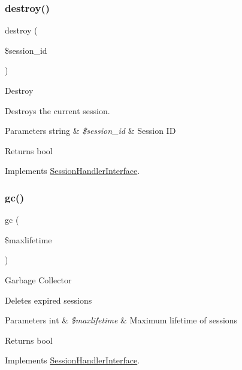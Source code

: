 \subsubsection{\texorpdfstring{destroy()}{destroy()}}
{\footnotesize\ttfamily destroy (\begin{DoxyParamCaption}\item[{}]{\$session\+\_\+id }\end{DoxyParamCaption})}

Destroy

Destroys the current session.


\begin{DoxyParams}[1]{Parameters}
string & {\em \$session\+\_\+id} & Session ID \\
\hline
\end{DoxyParams}
\begin{DoxyReturn}{Returns}
bool 
\end{DoxyReturn}


Implements \mbox{\hyperlink{interface_session_handler_interface_aaec5812f6b4eb6835f88d3baa06a002a}{Session\+Handler\+Interface}}.

\mbox{\label{class_c_i___session__files__driver_a57aff7ee0656d8aa75d545fb8b3ae35d}} 
\subsubsection{\texorpdfstring{gc()}{gc()}}
{\footnotesize\ttfamily gc (\begin{DoxyParamCaption}\item[{}]{\$maxlifetime }\end{DoxyParamCaption})}

Garbage Collector

Deletes expired sessions


\begin{DoxyParams}[1]{Parameters}
int & {\em \$maxlifetime} & Maximum lifetime of sessions \\
\hline
\end{DoxyParams}
\begin{DoxyReturn}{Returns}
bool 
\end{DoxyReturn}


Implements \mbox{\hyperlink{interface_session_handler_interface_a57aff7ee0656d8aa75d545fb8b3ae35d}{Session\+Handler\+Interface}}.

